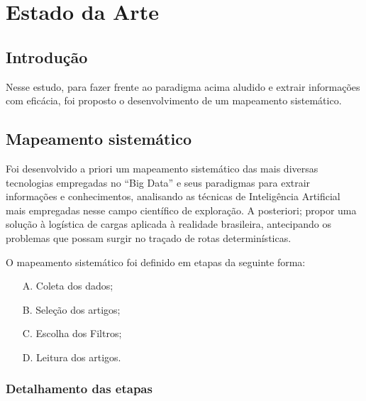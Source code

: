 \chapter{Estado da Arte}\label{arte}

\section{Introdução}\label{arte:intro}



Nesse estudo, para fazer frente ao paradigma acima aludido e extrair informações com eficácia, 
foi proposto o desenvolvimento de um mapeamento sistemático.

\section*{ Mapeamento sistemático}

Foi desenvolvido a priori um mapeamento sistemático das mais diversas tecnologias empregadas no ``Big Data'' e seus paradigmas para extrair informações e conhecimentos, 
analisando as técnicas de Inteligência Artificial mais empregadas nesse campo científico de exploração.
A posteriori; propor uma solução à logística de cargas aplicada à realidade brasileira, antecipando os problemas que possam surgir no traçado de rotas determinísticas. 

O mapeamento sistemático foi definido em etapas da seguinte forma:

\begin{enumerate}
 \item[A.] Coleta dos dados;
 \item[B.] Seleção dos artigos; 
 \item[C.] Escolha dos Filtros;
 \item[D.] Leitura dos artigos.
\end{enumerate}


\subsection{Detalhamento das etapas}

